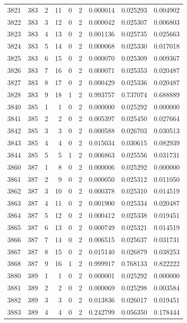 \begin{longtable}{rrrrrrrrr}
3821 & 383 & 2 & 11 & 0 & 2 & 0.000014 & 0.025293 & 0.004902 \\
3822 & 383 & 3 & 12 & 0 & 2 & 0.000042 & 0.025307 & 0.006803 \\
3823 & 383 & 4 & 13 & 0 & 2 & 0.001136 & 0.025735 & 0.025663 \\
3824 & 383 & 5 & 14 & 0 & 2 & 0.000068 & 0.025330 & 0.017018 \\
3825 & 383 & 6 & 15 & 0 & 2 & 0.000070 & 0.025309 & 0.009367 \\
3826 & 383 & 7 & 16 & 0 & 2 & 0.000071 & 0.025353 & 0.020487 \\
3827 & 383 & 8 & 17 & 0 & 2 & 0.000429 & 0.025336 & 0.020487 \\
3828 & 383 & 9 & 18 & 1 & 2 & 0.993757 & 0.737074 & 0.688889 \\
3840 & 385 & 1 & 1 & 0 & 2 & 0.000000 & 0.025292 & 0.000000 \\
3841 & 385 & 2 & 2 & 0 & 2 & 0.005397 & 0.025450 & 0.027664 \\
3842 & 385 & 3 & 3 & 0 & 2 & 0.000588 & 0.026703 & 0.030513 \\
3843 & 385 & 4 & 4 & 0 & 2 & 0.015034 & 0.030615 & 0.082939 \\
3844 & 385 & 5 & 5 & 1 & 2 & 0.006863 & 0.025556 & 0.031731 \\
3860 & 387 & 1 & 8 & 0 & 2 & 0.000006 & 0.025292 & 0.000000 \\
3861 & 387 & 2 & 9 & 0 & 2 & 0.000050 & 0.025312 & 0.011050 \\
3862 & 387 & 3 & 10 & 0 & 2 & 0.000378 & 0.025310 & 0.014519 \\
3863 & 387 & 4 & 11 & 0 & 2 & 0.001900 & 0.025334 & 0.020487 \\
3864 & 387 & 5 & 12 & 0 & 2 & 0.000412 & 0.025338 & 0.019451 \\
3865 & 387 & 6 & 13 & 0 & 2 & 0.000749 & 0.025321 & 0.014519 \\
3866 & 387 & 7 & 14 & 0 & 2 & 0.006515 & 0.025637 & 0.031731 \\
3867 & 387 & 8 & 15 & 0 & 2 & 0.015140 & 0.026879 & 0.038253 \\
3868 & 387 & 9 & 16 & 1 & 2 & 0.999917 & 0.768133 & 0.822222 \\
3880 & 389 & 1 & 1 & 0 & 2 & 0.000001 & 0.025292 & 0.000000 \\
3881 & 389 & 2 & 2 & 0 & 2 & 0.000069 & 0.025298 & 0.003584 \\
3882 & 389 & 3 & 3 & 0 & 2 & 0.013836 & 0.026017 & 0.019451 \\
3883 & 389 & 4 & 4 & 0 & 2 & 0.242799 & 0.056350 & 0.178444 \\

\end{longtable}

